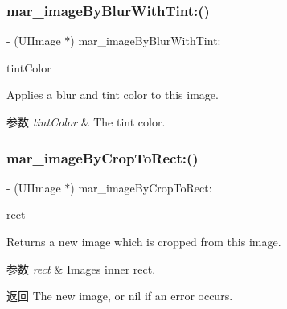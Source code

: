 \subsubsection{\texorpdfstring{mar\+\_\+image\+By\+Blur\+With\+Tint\+:()}{mar\_imageByBlurWithTint:()}}
{\footnotesize\ttfamily -\/ (U\+I\+Image $\ast$) mar\+\_\+image\+By\+Blur\+With\+Tint\+: \begin{DoxyParamCaption}\item[{(U\+I\+Color $\ast$)}]{tint\+Color }\end{DoxyParamCaption}}

Applies a blur and tint color to this image.


\begin{DoxyParams}{参数}
{\em tint\+Color} & The tint color. \\
\hline
\end{DoxyParams}
\mbox{\label{category_u_i_image_07_m_a_r_e_x_08_a199c6d0e4ae79a0deee0fd09ef495c90}} 
\subsubsection{\texorpdfstring{mar\+\_\+image\+By\+Crop\+To\+Rect\+:()}{mar\_imageByCropToRect:()}}
{\footnotesize\ttfamily -\/ (U\+I\+Image $\ast$) mar\+\_\+image\+By\+Crop\+To\+Rect\+: \begin{DoxyParamCaption}\item[{(C\+G\+Rect)}]{rect }\end{DoxyParamCaption}}

Returns a new image which is cropped from this image.


\begin{DoxyParams}{参数}
{\em rect} & Image\textquotesingle{}s inner rect.\\
\hline
\end{DoxyParams}
\begin{DoxyReturn}{返回}
The new image, or nil if an error occurs. 
\end{DoxyReturn}
\mbox{\label{category_u_i_image_07_m_a_r_e_x_08_a7e129904266795de6d7631b4ddc3449f}} 
